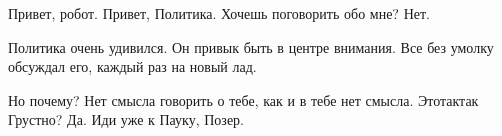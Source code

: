 \begin{dialog}
\X Привет, робот.
\R Привет, Политика.
\X Хочешь поговорить обо мне?
\R Нет.
\end{dialog}

\begin{monolog}
Политика очень удивился. Он привык быть в центре внимания. Все без умолку обсуждал его, каждый раз на новый лад.
\end{monolog}

\begin{dialog}
\X Но почему?
\R Нет смысла говорить о тебе, как и в тебе нет смысла.
\X Это\ldotst{}так\ldotst{}так\ldotst{}
\R Грустно?
\X Да.
\R Иди уже к Пауку, Позер.
\end{dialog}